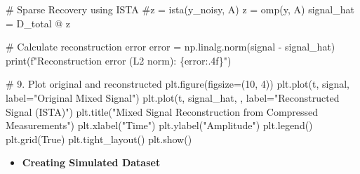 \documentclass[
  letterpaper,
  DIV=11,
  numbers=noendperiod]{scrartcl}
\newenvironment{Shaded}{\begin{snugshade}}{\end{snugshade}}
\newcommand{\BuiltInTok}[1]{\textcolor[rgb]{0.40,0.85,0.94}{#1}}
\newcommand{\CommentTok}[1]{\textcolor[rgb]{0.46,0.44,0.37}{#1}}
\newcommand{\DecValTok}[1]{\textcolor[rgb]{0.68,0.51,1.00}{#1}}
\newcommand{\NormalTok}[1]{\textcolor[rgb]{0.97,0.97,0.95}{#1}}
\newcommand{\OperatorTok}[1]{\textcolor[rgb]{0.97,0.97,0.95}{#1}}
\newcommand{\SpecialCharTok}[1]{\textcolor[rgb]{0.68,0.51,1.00}{#1}}
\newcommand{\SpecialStringTok}[1]{\textcolor[rgb]{0.90,0.86,0.45}{#1}}
\newcommand{\StringTok}[1]{\textcolor[rgb]{0.90,0.86,0.45}{#1}}
\newcommand{\VariableTok}[1]{\textcolor[rgb]{0.97,0.97,0.95}{#1}}
\providecommand{\tightlist}{%
  \setlength{\itemsep}{0pt}\setlength{\parskip}{0pt}}
\begin{document}
\begin{Shaded}
\begin{Highlighting}[]
\CommentTok{\# Sparse Recovery using ISTA}
\CommentTok{\#z = ista(y\_noisy, A)}
\NormalTok{z }\OperatorTok{=}\NormalTok{ omp(y, A)}
\NormalTok{signal\_hat }\OperatorTok{=}\NormalTok{ D\_total }\OperatorTok{@}\NormalTok{ z}

\CommentTok{\# Calculate reconstruction error}
\NormalTok{error }\OperatorTok{=}\NormalTok{ np.linalg.norm(signal }\OperatorTok{{-}}\NormalTok{ signal\_hat)}
\BuiltInTok{print}\NormalTok{(}\SpecialStringTok{f"Reconstruction error (L2 norm): }\SpecialCharTok{\{}\NormalTok{error}\SpecialCharTok{:.4f\}}\SpecialStringTok{"}\NormalTok{)}

\CommentTok{\# 9. Plot original and reconstructed}
\NormalTok{plt.figure(figsize}\OperatorTok{=}\NormalTok{(}\DecValTok{10}\NormalTok{, }\DecValTok{4}\NormalTok{))}
\NormalTok{plt.plot(t, signal, label}\OperatorTok{=}\StringTok{"Original Mixed Signal"}\NormalTok{)}
\NormalTok{plt.plot(t, signal\_hat, }\StringTok{\textquotesingle{}{-}{-}\textquotesingle{}}\NormalTok{, label}\OperatorTok{=}\StringTok{"Reconstructed Signal (ISTA)"}\NormalTok{)}
\NormalTok{plt.title(}\StringTok{"Mixed Signal Reconstruction from Compressed Measurements"}\NormalTok{)}
\NormalTok{plt.xlabel(}\StringTok{"Time"}\NormalTok{)}
\NormalTok{plt.ylabel(}\StringTok{"Amplitude"}\NormalTok{)}
\NormalTok{plt.legend()}
\NormalTok{plt.grid(}\VariableTok{True}\NormalTok{)}
\NormalTok{plt.tight\_layout()}
\NormalTok{plt.show()}
\end{Highlighting}
\end{Shaded}

\begin{itemize}
\tightlist
\item
  \textbf{Creating Simulated Dataset}
\end{itemize}
\end{document}
